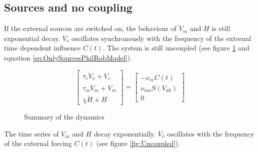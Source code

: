 \documentclass[a4paper, onecolumn, 10pt]{article}
\begin{document}
\clearpage
\subsection{Sources and no coupling}
If the external sources are switched on, the behaviour of $V_m$ and $H$ is still exponential decay. $V_v$ oscillates synchronously with the frequency of the external time dependent influence $C(t)$. The system is still uncoupled (see figure \ref{fig:OnlySourcesPhilRobModel} and equation \ref{eq:OnlySourcesPhilRobModel}).

\begin{equation}
\label{eq:OnlySourcesPhilRobModel}
\left[
\begin{array}{c}
\tau_v \dot V_v + V_v \\ 
\tau_m \dot V_m + V_m \\ 
\chi \dot H + H
\end{array}
\right]
=
\left[
\begin{array}{c}
-\nu_{vc} C(t) \\ 
\nu_{ma} S(V_{a0}) \\ 
0
\end{array}
\right]
\end{equation}


\begin{figure}[h]
\label{fig:OnlySourcesPhilRobModel}
\begin{center}
\end{center}
\caption{Summary of the dynamics}
\end{figure}

The time series of $V_m$ and $H$ decay exponentially. $V_v$ oscillates with the frequency of the external forcing $C(t)$ (see figure \ref{fig:Uncoupled}).
\end{document}
